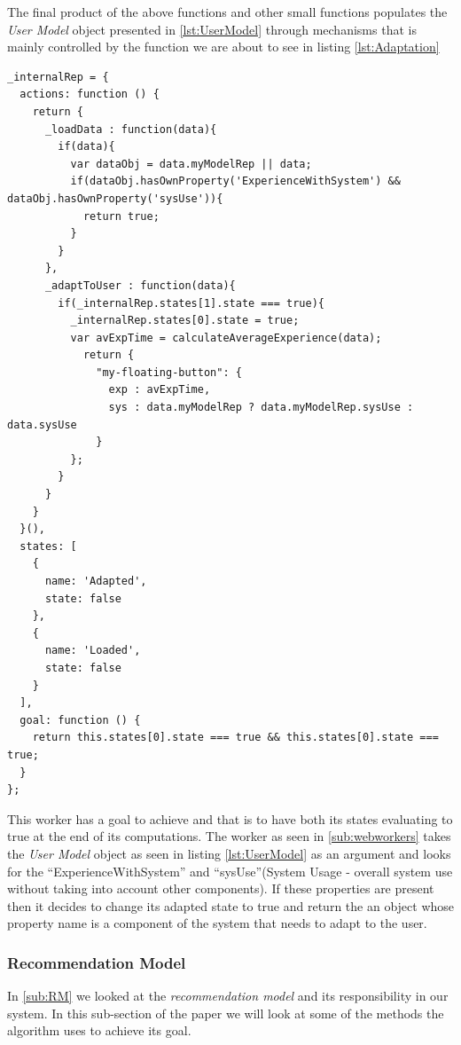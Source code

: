 The final product of the above functions and other small functions populates the \emph{User Model} object presented in \ref{lst:UserModel} through mechanisms that is mainly controlled by the function we are about to see in listing \ref{lst:Adaptation}
\begin{lstlisting}[caption={Agent Worker thread - internal representation of User}, label={lst:Adaptation}]
    _internalRep = {
  actions: function () {
    return {
      _loadData : function(data){
        if(data){
          var dataObj = data.myModelRep || data;
          if(dataObj.hasOwnProperty('ExperienceWithSystem') && dataObj.hasOwnProperty('sysUse')){
            return true;
          }
        }
      },
      _adaptToUser : function(data){
        if(_internalRep.states[1].state === true){
          _internalRep.states[0].state = true;
          var avExpTime = calculateAverageExperience(data);
            return {
              "my-floating-button": {
                exp : avExpTime,
                sys : data.myModelRep ? data.myModelRep.sysUse : data.sysUse
              }
          };
        }
      }
    }
  }(),
  states: [
    {
      name: 'Adapted',
      state: false
    },
    {
      name: 'Loaded',
      state: false
    }
  ],
  goal: function () {
    return this.states[0].state === true && this.states[0].state === true;
  }
};
\end{lstlisting}
This worker has a goal to achieve and that is to have both its states evaluating to true at the end of its computations. The worker as seen in \ref{sub:webworkers} takes the \emph{User Model} object as seen in listing \ref{lst:UserModel} as an argument and looks for the ``ExperienceWithSystem'' and ``sysUse''(System Usage - overall system use without taking into account other components). If these properties are present then it decides to change its adapted state to true and return the an object whose property name is a component of the system that needs to adapt to the user.

\subsubsection{Recommendation Model}
In \ref{sub:RM} we looked at the \emph{recommendation model} and its responsibility in our system. In this sub-section of the paper we will look at some of the methods the algorithm uses to achieve its goal.

